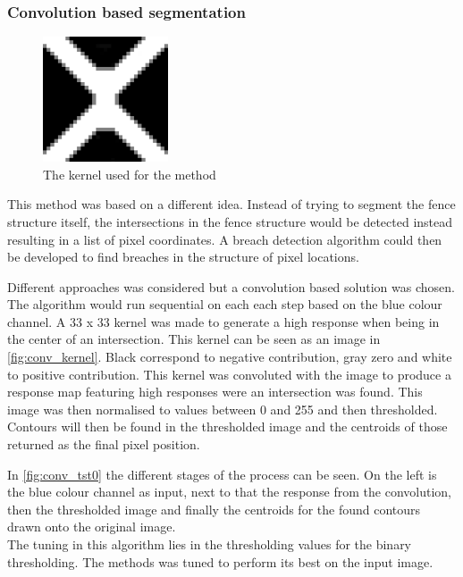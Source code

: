 \documentclass[../Head/Main.tex]{subfiles}
\begin{document}
\subsubsection{Convolution based segmentation}
\label{seg:conv_segmentation}
\begin{figure}
    \centering
    \vspace{-10pt}
    \includegraphics[width=0.33\textwidth]{../Figures/conv/kernel.png}
    \caption{The kernel used for the method}
    \label{fig:conv_kernel}
\end{figure}
This method was based on a different idea. Instead of trying to segment the fence structure itself, the intersections in the fence structure would be detected instead resulting in a list of pixel coordinates. A breach detection algorithm could then be developed to find breaches in the structure of pixel locations.\par 
Different approaches was considered but a convolution based solution was chosen. The algorithm would run sequential on each each step based on the blue colour channel. A 33 x 33 kernel was made to generate a high response when being in the center of an intersection. This kernel can be seen as an image in \autoref{fig:conv_kernel}. Black correspond to negative contribution, gray zero and white to positive contribution. This kernel was convoluted with the image to produce a response map featuring high responses were an intersection was found. This image was then normalised to values between 0 and 255 and then thresholded. Contours will then be found in the thresholded image and the centroids of those returned as the final pixel position.\par 

In \autoref{fig:conv_tst0} the different stages of the process can be seen. On the left is the blue colour channel as input, next to that the response from the convolution, then the thresholded image and finally the centroids for the found contours drawn onto the original image.\\
The tuning in this algorithm lies in the thresholding values for the binary thresholding. The methods was tuned to perform its best on the input image.
\end{document}
